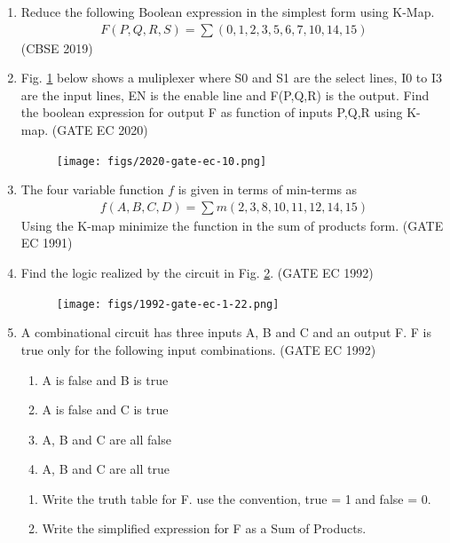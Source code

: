 \begin{enumerate}
\item 
	Reduce the following Boolean expression in the simplest form using K-Map.
		\begin{align}
F(P,Q,R,S) = \sum (0,1,2,3,5,6,7,10,14,15)
		\end{align}
\hfill (CBSE 2019)
\label{prob:2019/c/6/d}
%
\item Fig. \ref{fig:2020/gate/ec/10} below shows a muliplexer where S0 and S1 are the select lines, I0 to I3 are the input lines, EN is the enable line and F(P,Q,R) is the output. Find the boolean expression for output F as function of inputs P,Q,R using K-map. 
%
\label{prob:2020/gate/ec/10}
\hfill (GATE EC 2020)
\begin{figure}[ht]
\centering
	\texttt{[image: figs/2020-gate-ec-10.png]}
\caption{}
\label{fig:2020/gate/ec/10}
\end{figure}
%
\item
	The four variable function $f$ is given in terms of min-terms as
		\begin{align}
	    f(A,B,C,D) = \sum m(2,3,8,10,11,12,14,15)
\label{eq:1991/gate/ec/9}
		\end{align}
	    Using the K-map minimize the function in the sum of products form. 
\label{prob:1991/gate/ec/9}
\hfill (GATE EC 1991)
\item Find the logic realized by the circuit in Fig. 
\ref{fig:1992/gate/ec/1/22}.
\label{prob:1992/gate/ec/1/22}
\hfill (GATE EC 1992)
\begin{figure}[ht]
\centering
	\texttt{[image: figs/1992-gate-ec-1-22.png]}
\caption{}
\label{fig:1992/gate/ec/1/22}
\end{figure}
\item
	A combinational circuit has three inputs A, B and C and an output F. F is true only for the following input combinations. 
\hfill (GATE EC 1992)
\label{prob:1992/gate/ec/2/9}
	\begin{enumerate}
		\item A is false and B is true 
		\item A is false and C is true 
		\item A, B and C are all false 
		\item A, B and C are all true 
	\end{enumerate}
	\begin{enumerate}
\item Write the truth table for F. use the convention, true = 1 and false = 0. 
\item Write the simplified expression for F as a Sum of Products. 

\end{enumerate}
\end{enumerate}
